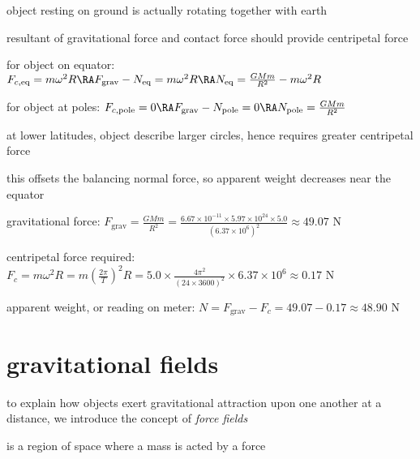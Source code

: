 object resting on ground is actually rotating together with earth

resultant of gravitational force and contact force should provide centripetal force

for object on equator: $F_{c,\text{eq}} = m\omega^2 R \RA F_\text{grav} - N_\text{eq} = m \omega^2 R  \RA N_\text{eq} = \frac{GMm}{R^2} - m \omega^2 R$

for object at poles: $F_{c,\text{pole}} = 0 \RA F_\text{grav} - N_\text{pole} = 0  \RA N_\text{pole} = \frac{GMm}{R^2}$

at lower latitudes, object describe larger circles, hence requires greater centripetal force

this offsets the balancing normal force, so apparent weight decreases near the equator


\sol gravitational force: $F_\text{grav} = \frac{GMm}{R^2} = \frac{6.67\times10^{-11}\times5.97\times10^{24}\times5.0}{(6.37\times10^6)^2} \approx 49.07 \text{ N}$

centripetal force required: $F_c = m\omega^2 R = m\left(\frac{2\pi}{T}\right)^2R = 5.0\times\frac{4\pi^2}{(24\times3600)^2}\times6.37\times10^6 \approx 0.17 \text{ N}$

apparent weight, or reading on meter: $N = F_\text{grav} - F_c = 49.07 - 0.17 \approx 48.90 \text{ N}$ \eoe




\chapter{gravitational fields}

to explain how objects exert gravitational attraction upon one another at a distance, we introduce the concept of \emph{force fields}

\begin{ilight}
	 is a region of space where a mass is acted by a force
\end{ilight}

